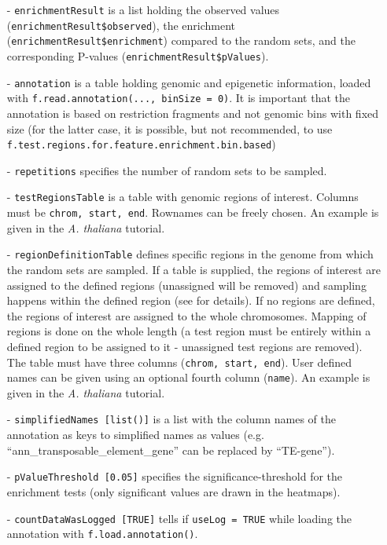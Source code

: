 \documentclass[a4paper,10pt]{article}
\begin{document}
\begin{itemize}
 \item[-] \texttt{enrichmentResult} is a list holding the observed values (\texttt{enrichmentResult\$observed}), the enrichment (\texttt{enrichmentResult\$enrichment}) compared to the random sets, and the corresponding P-values (\texttt{enrichmentResult\$pValues}).
 \item[-] \texttt{annotation} is a table holding genomic and epigenetic information, loaded with \texttt{f.read.annotation(..., binSize = 0)}. It is important that the annotation is based on restriction fragments and not genomic bins with fixed size (for the latter case, it is possible, but not recommended, to use \texttt{f.test.regions.for.feature.enrichment.bin.based})
 \item[-] \texttt{repetitions} specifies the number of random sets to be sampled.
 \item[-] \texttt{testRegionsTable} is a table with genomic regions of interest. Columns must be \texttt{chrom, start, end}. Rownames can be freely chosen. An example is given in the \textit{A. thaliana} tutorial.
 \item[-] \texttt{regionDefinitionTable} defines specific regions in the genome from which the random sets are sampled. If a table is supplied, the regions of interest are assigned to the defined regions (unassigned will be removed) and sampling happens within the defined region (see \cite{2014_Grob} for details). If no regions are defined, the regions of interest are assigned to the whole chromosomes. Mapping of regions is done on the whole length (a test region must be entirely within a defined region to be assigned to it - unassigned test regions are removed). The table must have three columns (\texttt{chrom, start, end}). User defined names can be given using an optional fourth column (\texttt{name}). An example is given in the \textit{A. thaliana} tutorial.
 \item[-] \texttt{simplifiedNames [list()]} is a list with the column names of the annotation as keys to simplified names as values (e.g. ``ann\_transposable\_element\_gene'' can be replaced by ``TE-gene'').
 \item[-] \texttt{pValueThreshold [0.05]} specifies the significance-threshold for the enrichment tests (only significant values are drawn in the heatmaps).
 \item[-] \texttt{countDataWasLogged [TRUE]} tells if \texttt{useLog = TRUE} while loading the annotation with \texttt{f.load.annotation()}.
\end{itemize}
\clearpage
\end{document}
